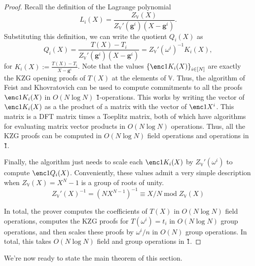 \documentclass[11pt]{article} %
\newcommand{\defeq}{:=}
\newcommand{\sett}[2]{\ensuremath{\set{#1}_{#2}}\xspace}
\renewcommand{\mod}{\ensuremath{\;\mathrm{mod}\;}}
\newcommand{\set}[1]{\ensuremath{\left\{#1\right\}}\xspace}
\newcommand{\vgen}{\ensuremath{\mathbf{g}}\xspace}
\newcommand{\bigspace}{\ensuremath{\mathbb{V}}\xspace}
\newcommand{\tabsize}{\ensuremath{N}\xspace}
\newcommand{\tabruntime}{\ensuremath{\tabsize\log\tabsize}\xspace}
\begin{document}
\begin{proof} 
    Recall the definition of the Lagrange polynomial
    \[L_i(X) = \frac{Z_\bigspace(X)}{Z_\bigspace'(\vgen^i) (X - \vgen^i)}.\]
    Substituting this definition, we can write the quotient $Q_i(X)$ as 
    \[Q_i(X) = \frac{T(X) - T_i}{Z_\bigspace'(\vgen^i) (X - \vgen^i)} =
    Z_\bigspace'(\omega^i)^{-1} K_i(X), \]
for $K_i(X)\defeq \frac{T(X)-T_i}{X-\vgen^i}$.
Note that the values \sett{\enc1{K_i(X)}}{i\in [\tabsize]} are exactly the KZG opening proofs of $T(X)$ at the
elements of \bigspace.
    Thus, the algorithm of Feist and Khovratovich \cite{fastkzgproofsorig, fastkzgproofs} 
    can be used to compute commitments to all the proofs $\enc1{K_i(X)}$ 
    in $O(\tabruntime)$ \G1-operations. This works by writing the vector of
    $\enc1{K_i(X)}$ as a the product of a matrix with the vector of
    $\enc1{X^i}$. This matrix is a DFT matrix times a Toeplitz matrix, both of
    which have algorithms for evaluating matrix vector products in
    $O(\tabruntime)$ operations. Thus, all the KZG proofs can be computed in
    $O(\tabruntime)$ field operations and operations in \G1.
    
    Finally, the algorithm just needs to scale each $\enc1{K_i(X)}$ by
    $Z_{\bigspace}'(\omega^i)$ to compute $\enc1{Q_i(X)}$. Conveniently, these
    values admit a very simple description when $Z_\bigspace(X) = X^\tabsize -
    1$ is a group of roots of unity.
    \[Z_\bigspace'(X)^{-1} = (\tabsize X^{\tabsize-1})^{-1} \equiv X / \tabsize \mod Z_\bigspace(X)\] 

    In total, the prover computes the coefficients of $T(X)$ in $O(\tabruntime)$
    field operations, computes the KZG proofs for $T(\omega^i) = t_i$ in
    $O(\tabruntime)$ group operations, and then scales these proofs by $\omega^i
    / n$ in $O(\tabsize)$ group operations. In total, this takes
    $O(\tabruntime)$ field and group operations in \G1.
\end{proof}

We're now ready to state the main theorem of this section.
\end{document}
